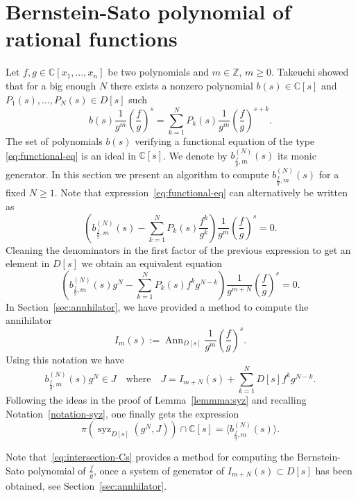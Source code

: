 \documentclass[a4paper,12pt]{amsart}
\theoremstyle{plain}
\theoremstyle{definition}
\theoremstyle{remark}
\def\CC{\mathbb{C}}
\def\ZZ{\mathbb{Z}}
\DeclareMathOperator{\Ann}{Ann}
\DeclareMathOperator{\syz}{syz}
\begin{document}
\section{Bernstein-Sato polynomial of rational functions}\label{sec:BS}

Let $f,g \in \CC[x_1,\ldots,x_n]$ be two polynomials and $m \in \ZZ$, $m \geq 0$.
Takeuchi \cite{Tak23} showed that for a big enough $N$ there exists a nonzero polynomial $b(s) \in \CC[s]$
and $P_1(s),\ldots,P_N(s) \in D[s]$ such
\begin{equation}\label{eq:functional-eq}
b(s) \frac{1}{g^m} \left( \frac{f}{g} \right)^s =
\sum_{k = 1}^N P_k(s) \frac{1}{g^m} \left( \frac{f}{g} \right)^{s+k}.
\end{equation}
The set of polynomials $b(s)$ verifying a functional equation of the type \eqref{eq:functional-eq} is an ideal in $\CC[s]$.
We denote by $b_{\frac{f}{g},m}^{(N)}(s)$ its monic generator.
In this section we present an algorithm to compute $b_{\frac{f}{g},m}^{(N)}(s)$ for a fixed $N \geq 1$. Note that expression~\eqref{eq:functional-eq} can alternatively be written as
\[
\left( b_{\frac{f}{g},m}^{(N)}(s) - \sum_{k = 1}^N P_k(s) \frac{f^k}{g^k} \right) \frac{1}{g^m} \left( \frac{f}{g} \right)^s = 0.
\]
Cleaning the denominators in the first factor of the previous expression to get an element in $D[s]$ we obtain
an equivalent equation
\[
\left( b_{\frac{f}{g},m}^{(N)}(s) g^N - \sum_{k = 1}^N P_k(s) f^k g^{N-k} \right) \frac{1}{g^{m+N}} \left( \frac{f}{g} \right)^s = 0.
\]
In Section~\ref{sec:annhilator}, we have provided a method to compute the annihilator
\[
I_m(s) := \Ann_{D[s]} \frac{1}{g^m} \left( \frac{f}{g} \right)^s.
\]
Using this notation we have
\begin{equation}\label{eq:BernsteinGN}
b_{\frac{f}{g},m}^{(N)} (s) g^N \in J \quad \mbox{where} \quad
J = I_{m+N}(s) + \sum_{k = 1}^N D[s] f^k g^{N-k}.
\end{equation}
Following the ideas in the proof of Lemma~\ref{lemmma:syz} and recalling Notation~\ref{notation-syz},
one finally gets the expression
\begin{equation}\label{eq:intersection-Cs}
\pi(\syz_{D[s]}(g^N,J)) \cap \CC[s] = \Big\langle b_{\frac{f}{g},m}^{(N)}(s) \Big\rangle.
\end{equation}

Note that~\eqref{eq:intersection-Cs} provides a method for computing the Bernstein-Sato polynomial of $\frac{f}{g}$, once a system of generator of $I_{m+N}(s) \subset D[s]$ has been obtained, see Section~\ref{sec:annhilator}.
\end{document}
